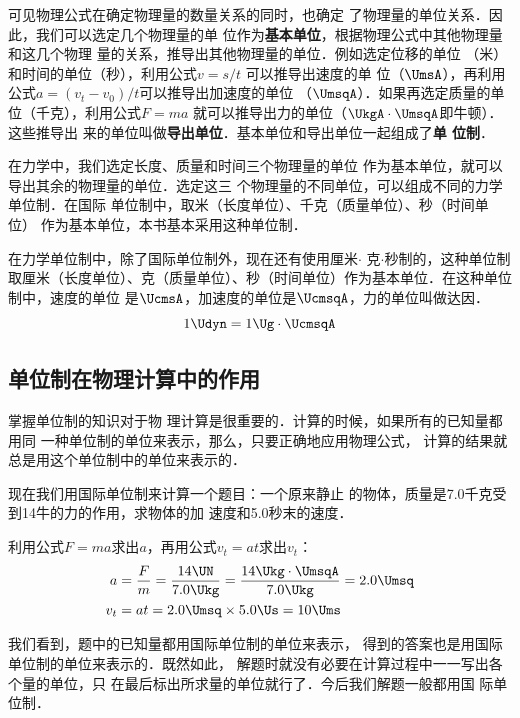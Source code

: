 可见物理公式在确定物理量的数量关系的同时，也确定
了物理量的单位关系．因此，我们可以选定几个物理量的单
位作为\textbf{基本单位}，根据物理公式中其他物理量和这几个物理
量的关系，推导出其他物理量的单位．例如选定位移的单位
（米）和时间的单位（秒），利用公式$v=s/t$
可以推导出速度的单
位（$\UmsA$），再利用公式$a=(v_t-v_0)/t$可以推导出加速度的单位
（$\UmsqA$）．如果再选定质量的单位（千克），利用公式$F=ma$
就可以推导出力的单位（$\UkgA\cdot \UmsqA$即牛顿）．这些推导出
来的单位叫做\textbf{导出单位}．基本单位和导出单位一起组成了\textbf{单
位制}．

在力学中，我们选定长度、质量和时间三个物理量的单位
作为基本单位，就可以导出其余的物理量的单位．选定这三
个物理量的不同单位，可以组成不同的力学单位制．在国际
单位制中，取米（长度单位）、千克（质量单位）、秒（时间单位）
作为基本单位，本书基本采用这种单位制．

在力学单位制中，除了国际单位制外，现在还有使用厘米$\cdot$
克$\cdot$秒制的，这种单位制取厘米（长度单位）、克（质量单位）、秒（时间单位）作为基本单位．在这种单位制中，速度的单位
是$\UcmsA$，加速度的单位是$\UcmsqA$，力的单位叫做达因．
\[1 \Udyn =1 \Ug\cdot \UcmsqA  \]


\subsection{单位制在物理计算中的作用}
掌握单位制的知识对于物
理计算是很重要的．计算的时候，如果所有的已知量都用同
一种单位制的单位来表示，那么，只要正确地应用物理公式，
计算的结果就总是用这个单位制中的单位来表示的．

现在我们用国际单位制来计算一个题目：一个原来静止
的物体，质量是7.0千克受到14牛的力的作用，求物体的加
速度和5.0秒末的速度．

利用公式$F= ma$求出$a$，再用公式$v_t= at$求出$v_t$：
\[\begin{split}
a&=\frac{F}{m}=\frac{14 \UN}{7.0\Ukg}=\frac{14\Ukg\cdot \UmsqA}{7.0\Ukg}=2.0\Umsq\\
v_t&=at=2.0\Umsq \times 5.0\Us=10\Ums
\end{split} \]

我们看到，题中的已知量都用国际单位制的单位来表示，
得到的答案也是用国际单位制的单位来表示的．既然如此，
解题时就没有必要在计算过程中一一写出各个量的单位，只
在最后标出所求量的单位就行了．今后我们解题一般都用国
际单位制．


